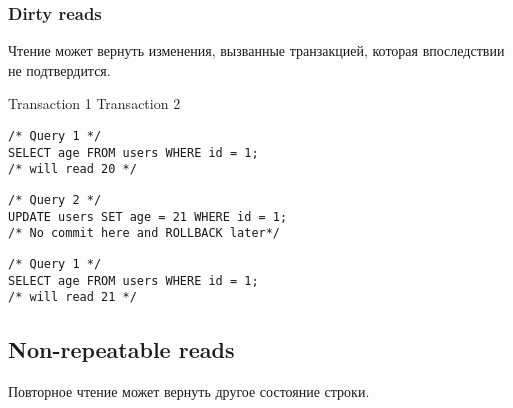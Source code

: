 \subsubsection{Dirty reads}
Чтение может вернуть изменения, вызванные транзакцией, которая впоследствии не подтвердится.

\begin{minipage}{.5\linewidth}
\hfil Transaction 1 \hfil   \hfil Transaction 2 \hfil
\begin{flushleft}\begin{minipage}{.6\textwidth}
\begin{verbatim}
/* Query 1 */
SELECT age FROM users WHERE id = 1;
/* will read 20 */
\end{verbatim}
\end{minipage}\end{flushleft}

\begin{flushright}\begin{minipage}{.6\textwidth}
\begin{verbatim}
/* Query 2 */
UPDATE users SET age = 21 WHERE id = 1;
/* No commit here and ROLLBACK later*/
\end{verbatim}
\end{minipage}
\end{flushright}

\begin{flushleft}\begin{minipage}{.6\textwidth}
\begin{verbatim}
/* Query 1 */
SELECT age FROM users WHERE id = 1;
/* will read 21 */
\end{verbatim}
\end{minipage}\end{flushleft}
\end{minipage}

\subsection{Non-repeatable reads}
Повторное чтение может вернуть другое состояние строки.

